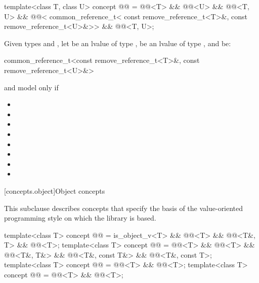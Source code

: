 \begin{itemdecl}
template<class T, class U>
  concept @@ =
    @@<T> && @@<U> &&
    @@<T, U> &&
    @@<
      common_reference_t<
        const remove_reference_t<T>&,
        const remove_reference_t<U>&>> &&
    @@<T, U>;
\end{itemdecl}

\begin{itemdescr}
\pnum
Given types  and ,
let  be an lvalue of type ,
 be an lvalue of type ,
and  be:
\begin{codeblock}
common_reference_t<const remove_reference_t<T>&, const remove_reference_t<U>&>
\end{codeblock}
 and  model
 only if

\begin{itemize}
\item {}
\item {}
\item {}
\item {}
\item {}
\item {}
\item {}
\item {}
\end{itemize}
\end{itemdescr}

[concepts.object]{Object concepts}

\pnum
This subclause describes concepts that specify the basis of the
value-oriented programming style on which the library is based.

\begin{itemdecl}
template<class T>
  concept @@ = is_object_v<T> && @@<T> &&
                    @@<T&, T> && @@<T>;
template<class T>
  concept @@ = @@<T> && @@<T> && @@<T&, T&> &&
                     @@<T&, const T&> && @@<T&, const T>;
template<class T>
  concept @@ = @@<T> && @@<T>;
template<class T>
  concept @@ = @@<T> && @@<T>;
\end{itemdecl}

